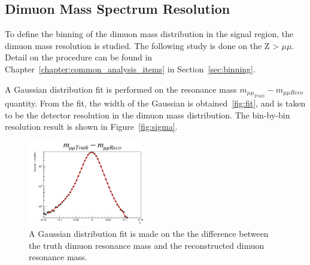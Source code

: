 %


\subsection{Dimuon Mass Spectrum Resolution}
To define the binning of the dimuon mass distribution in the signal region, the dimuon mass resolution is studied. The following study is done on the Z > $\mu \mu$. Detail on the procedure can be found in Chapter~\ref{chapter:common_analysis_items} in Section~\ref{sec:binning}.

A Gaussian distribution fit is performed on the resonance mass $m_{\mu\mu_{Truth}} - m_{\mu\mu{Reco}}$ quantity. From the fit, the width of the Gaussian is obtained~\ref{fig:fit}, and is taken to be the detector resolution in the dimuon mass distribution. The bin-by-bin resolution result is shown in Figure~\ref{fig:sigma}.    

\begin{figure}[!htb]
    \begin{center}
        \includegraphics[width=0.45\textwidth]{figures/chapter_dimuon/fitError}        
        \caption{
            A Gaussian distribution fit is made on the the difference between the truth dimuon resonance mass and the reconstructed dimuon resonance mass.    }
    \end{center}
\end{figure}
\FloatBarrier
   
